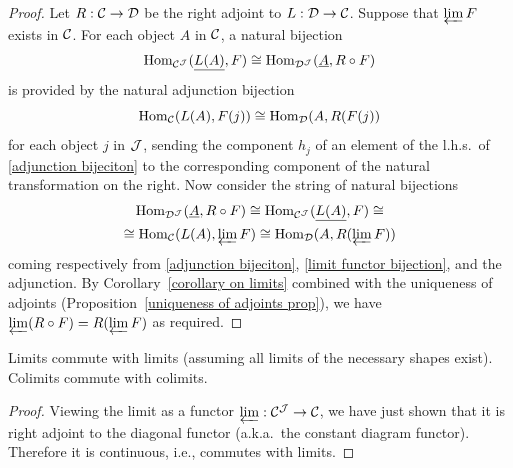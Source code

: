 \begin{proof}
    Let $R:\mathcal{C} \to \mathcal{D} $ be the right adjoint to $L:\mathcal{D} \to\mathcal{C} $. Suppose that $\varprojlim F$ exists in $\mathcal{C} $. For each object $A$ in $\mathcal{C} $, a natural bijection
    \[\operatorname{Hom}_{\mathcal{C} ^{\mathcal{J}} }(\underline{L(A)},F)\cong \operatorname{Hom}_{\mathcal{D} ^{\mathcal{J}} }(\underline{A},R\circ F) \label{adjunction bijeciton}\]
    is provided by the natural adjunction bijection
    \[\operatorname{Hom}_{\mathcal{C} }(L(A),F(j))\cong \operatorname{Hom}_{\mathcal{D} }(A,R(F(j))\]
    for each object $j$ in $\mathcal{J} $, sending the component $h_j$ of an element of the l.h.s.~of \eqref{adjunction bijeciton} to the corresponding component of the natural transformation on the right. Now consider the string of natural bijections
    \begin{multline}
        \operatorname{Hom}_{\mathcal{D} ^{\mathcal{J}} }(\underline{A},R\circ F)\cong \operatorname{Hom}_{\mathcal{C} ^{\mathcal{J}} }(\underline{L(A)},F)\cong \\ 
        \cong \operatorname{Hom}_{\mathcal{C} }(L(A),\varprojlim F)\cong \operatorname{Hom}_{\mathcal{D} }(A,R(\varprojlim F))
    \end{multline}
    coming respectively from \eqref{adjunction bijeciton}, \eqref{limit functor bijection}, and the adjunction. By Corollary~\ref{corollary on limits} combined with the uniqueness of adjoints (Proposition~\ref{uniqueness of adjoints prop}), we have $\varprojlim(R\circ F)= R(\varprojlim F)$ as required.
\end{proof}
\begin{cor}
    Limits commute with limits (assuming all limits of the necessary shapes exist). Colimits commute with colimits.
\end{cor}
\begin{proof}
    Viewing the limit as a functor  $\varprojlim:\mathcal{C}^{\mathcal{J}}\to \mathcal{C}$, we have just shown that it is right adjoint to the diagonal functor (a.k.a.~the constant diagram functor). Therefore it is continuous, i.e., commutes with limits. 
\end{proof}

